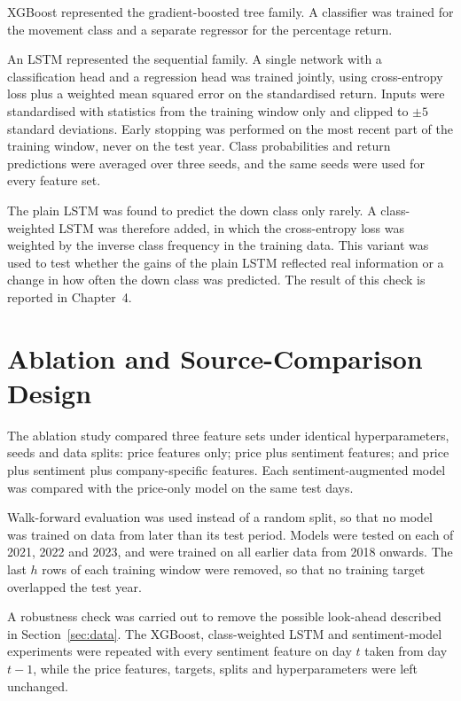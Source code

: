 XGBoost \parencite{chen2016xgboost} represented the gradient-boosted tree family. A classifier was trained for the movement class and a separate regressor for the percentage return.

An LSTM \parencite{hochreiter1997long} represented the sequential family. A single network with a classification head and a regression head was trained jointly, using cross-entropy loss plus a weighted mean squared error on the standardised return. Inputs were standardised with statistics from the training window only and clipped to $\pm 5$ standard deviations. Early stopping was performed on the most recent part of the training window, never on the test year. Class probabilities and return predictions were averaged over three seeds, and the same seeds were used for every feature set.

The plain LSTM was found to predict the down class only rarely. A class-weighted LSTM was therefore added, in which the cross-entropy loss was weighted by the inverse class frequency in the training data. This variant was used to test whether the gains of the plain LSTM reflected real information or a change in how often the down class was predicted. The result of this check is reported in Chapter~4.

\section{Ablation and Source-Comparison Design}
\label{sec:ablation}
The ablation study compared three feature sets under identical hyperparameters, seeds and data splits: price features only; price plus sentiment features; and price plus sentiment plus company-specific features. Each sentiment-augmented model was compared with the price-only model on the same test days.

Walk-forward evaluation was used instead of a random split, so that no model was trained on data from later than its test period. Models were tested on each of 2021, 2022 and 2023, and were trained on all earlier data from 2018 onwards. The last $h$ rows of each training window were removed, so that no training target overlapped the test year.

A robustness check was carried out to remove the possible look-ahead described in Section~\ref{sec:data}. The XGBoost, class-weighted LSTM and sentiment-model experiments were repeated with every sentiment feature on day $t$ taken from day $t-1$, while the price features, targets, splits and hyperparameters were left unchanged.

